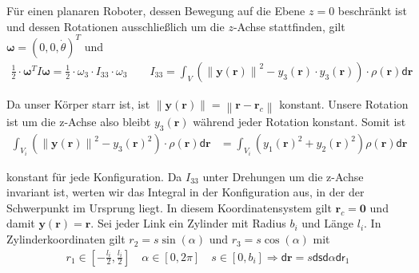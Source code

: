 \documentclass[a4paper, 12pt]{scrartcl}
\newcommand{\norm}[1]{\left\lVert#1\right\lVert}
\begin{document}
\begin{beispiel}\label{ex:planar_robot_inertia}
    Für einen planaren Roboter, dessen Bewegung auf die Ebene $z = 0$
    beschränkt ist und dessen Rotationen ausschließlich um die $z$-Achse
    stattfinden, gilt $\bm{\omega} = (0,0,\dot{\theta})^T$ und
    \begin{align*}
        \frac{1}{2} \cdot 
        \bm{\omega}^T I \bm{\omega}
        =
        \frac{1}{2} \cdot 
        \omega_3
        \cdot 
        I_{33}
        \cdot
        \omega_3
        \qquad
        I_{33} 
        = 
        \int_{V} 
        \left(
            \norm{\bm{y}(\bm{r})}^2 - y_3(\bm{r}) \cdot y_3(\bm{r})
        \right) 
        \cdot 
        \rho(\bm{r}) \mathsf{d}\bm{r}
    \end{align*}

    Da unser Körper starr ist, ist $\norm{\bm{y}(\bm{r})}= \norm{\bm{r} - \bm{r}_{c}}$ 
    konstant. Unsere Rotation ist um die z-Achse also bleibt 
    $y_3(\bm{r})$ während jeder Rotation konstant. Somit ist
    \begin{align*}
        \int_{V_i}
        \left(
            \norm{\bm{y}(\bm{r})}^2 - y_3(\bm{r})^2
        \right)
        \cdot
        \rho(\bm{r}) 
        \mathsf{d}\bm{r}
        &=
        \int_{V_i}
        \left(
            y_1(\bm{r})^2 + y_2(\bm{r})^2
        \right)
        \rho(\bm{r}) 
        \mathsf{d}\bm{r}
    \end{align*}

    konstant für jede Konfiguration. 
    Da $I_{33}$ unter Drehungen um die z-Achse invariant ist, 
    werten wir das Integral in der Konfiguration aus, 
    in der der Schwerpunkt im Ursprung liegt. In diesem Koordinatensystem gilt
    $\bm{r}_{c} = \bm{0}$ und damit $\bm{y}(\bm{r}) = \bm{r}$.
    Sei jeder Link ein Zylinder mit Radius $b_i$ und Länge $l_i$. 
    In Zylinderkoordinaten gilt $r_2 = s \sin(\alpha)$ und $r_3 = s \cos(\alpha)$
    mit
    \begin{align*}
        r_1
        \in
        \left[
            -\frac{l_i}{2} , \frac{l_i}{2}
        \right]
        \quad
        \alpha
        \in
        \left[
            0, 2\pi
        \right]
        \quad
        s \in
        \left[
            0, b_i
        \right]
        \Rightarrow
        \mathsf{d}\bm{r}
        =
        s
        \mathsf{ds}
        \mathsf{d\alpha}
        \mathsf{dr}_1
    \end{align*}


\end{beispiel}
\end{document}
